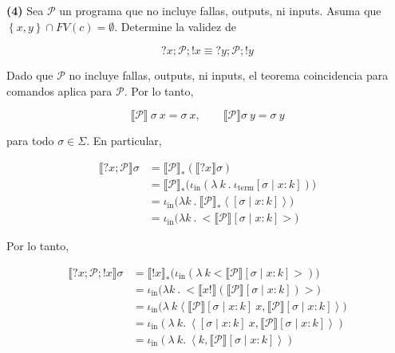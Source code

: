 \documentclass[article, 12pt]{article}
\begin{document}
\pagebreak 

\begin{myframe}
  \textbf{(4)} Sea $\mathcal{P}$ un programa que no incluye fallas, outputs, ni
  inputs. Asuma que $\left\{ x, y \right\} \cap FV(c) = \emptyset$. Determine la
  validez de 

  \begin{equation*}
    ?x; \mathcal{P}; !x \equiv ?y ; \mathcal{P}; !y
  \end{equation*}
\end{myframe}

Dado que $\mathcal{P}$ no incluye fallas, outputs, ni inputs, el teorema
coincidencia para comandos aplica para $\mathcal{P}$. Por lo tanto, 

\begin{equation*}
  \llbracket \mathcal{P} \rrbracket ~ \sigma ~ x = \sigma ~x, \qquad
  \llbracket \mathcal{P} \rrbracket\sigma ~ y = \sigma ~ y
\end{equation*}

para todo $\sigma \in \Sigma$. En particular, 

\begin{align*}
  \llbracket ?x ; \mathcal{P} \rrbracket\sigma 
  &= \llbracket \mathcal{P} \rrbracket_* \left( \llbracket ?x \rrbracket \sigma
  \right)  \\ 
  &=\llbracket \mathcal{P} \rrbracket_* \Big( \iota_{\text{in}} \left(\lambda ~
      k ~.~ \iota_{\text{term}}[\sigma \mid x :
  k] \right) \Big) \\ 
  &=\iota_{\text{in}} \Big( \lambda k ~. ~ \llbracket \mathcal{P} \rrbracket_*
  \left< [\sigma \mid x : k] \right> \Big) \\ 
  &=\iota_{\text{in}} \Big( \lambda k ~ . ~ \Big< \llbracket \mathcal{P} \rrbracket[\sigma \mid x : k]\Big> \Big)
\end{align*}

Por lo tanto, 

\begin{align*}
  \llbracket ?x ; \mathcal{P}; !x \rrbracket\sigma 
  &= \llbracket !x \rrbracket_* \Big( \iota_{\text{in}}\left( \lambda ~ k \Big<
  \llbracket \mathcal{P} \rrbracket[\sigma \mid x : k]\Big> \right)  \Big)  \\ 
  &=\iota_{\text{in}} \Big( \lambda k ~. ~ \Big< \llbracket x! \rrbracket\left(
  \llbracket \mathcal{P} \rrbracket[\sigma \mid x : k]\right)  \Big> \Big) \\ 
  &= \iota_{\text{in}} \Big( \lambda ~ k \left< \llbracket \mathcal{P} \rrbracket[\sigma
  \mid x  : k ] ~ x, \llbracket \mathcal{P} \rrbracket[\sigma\mid x : k] \right>
\Big) \\ 
  &=\iota_{\text{in}} \left( \lambda ~ k .~\left< [\sigma \mid x : k] ~ x,
  \llbracket \mathcal{P} \rrbracket[\sigma \mid x : k] \right> \right) \\
  &=\iota_{\text{in}} \left( \lambda ~ k .~\left< k,
  \llbracket \mathcal{P} \rrbracket[\sigma \mid x : k] \right> \right) 
\end{align*} 
\end{document}
